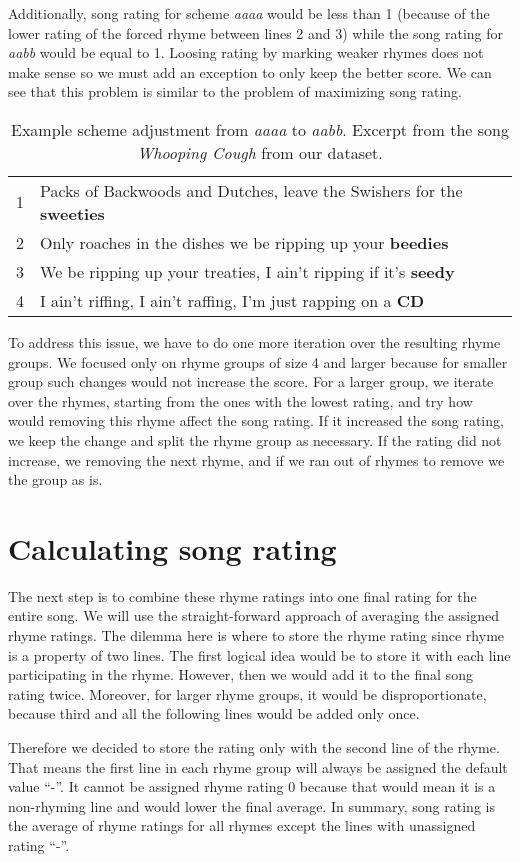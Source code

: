Additionally, song rating  for scheme \textit{aaaa} would be less than 1 (because of the lower rating of the forced rhyme between lines 2 and 3) while the song rating for \textit{aabb} would be equal to 1. Loosing rating by marking weaker rhymes does not make sense\added{,} so we must add an exception to only keep the better score. We can see that this problem is similar to the problem of maximizing song rating. 

\begin{table}
	\begin{tabular}{l l}
		1&Packs of Backwoods and Dutches, leave the Swishers for the \textbf{sweeties}  \\
		2&Only roaches in the dishes we be ripping up your \textbf{beedies}  \\
		3&We be ripping up your treaties, I ain't ripping if it's \textbf{seedy}  \\
		4&I ain't riffing, I ain't raffing, I'm just rapping on a \textbf{CD} \\
	\end{tabular}
	\caption[Scheme adjustment example.]{Example  scheme adjustment from \textit{aaaa} to \textit{aabb}. Excerpt from the song \textit{Whooping Cough} from  our dataset.}
	\label{scheme_adjustment}
\end{table}

To address this issue, we have to do one more iteration over the resulting rhyme groups. We focused only on rhyme groups of size 4 and larger because for smaller group such changes would not increase the score. For a larger group, we iterate over the rhymes, starting from the ones with the lowest rating, and try how would removing this rhyme affect the song rating. If it increased the song rating, we keep the change and split the rhyme group as necessary. If the rating did not increase, we  removing the next rhyme, and if we ran out of rhymes to remove\added{,} we  the group as is.

\section{Calculating song rating}\label{sec:song-rating}
The next step is to combine these rhyme ratings into one final rating for the entire song. We will use the straight-forward approach of averaging the assigned rhyme ratings. The dilemma here is where to store the rhyme rating since rhyme is a property of two lines. The first logical idea would be to store it with each line participating in the rhyme. However, then we would add it to the final song rating twice. Moreover, for larger rhyme groups, it would be disproportionate, because third and all the following lines would be added only once. 

Therefore\added{,} we decided to store the rating only with the second line of the rhyme. That means the first line in each rhyme group will always be assigned the default value ``-''. It cannot be assigned rhyme rating 0 because that would mean it is a non-rhyming line and would lower the final average. In summary, song rating is the average of rhyme ratings for all rhymes except the lines with unassigned rating ``-''.
